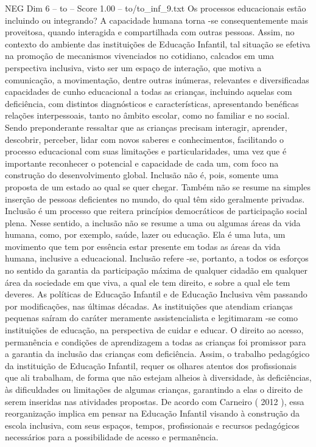 \begin{textsample}{NEG Dim 6 – to – Score 1.00 – to/to\_inf\_9.txt}
Os processos educacionais estão incluindo ou integrando?
A capacidade humana torna -se consequentemente mais proveitosa, quando interagida e compartilhada com outras pessoas.
Assim, no contexto do ambiente das instituições de Educação Infantil, tal situação se efetiva na promoção de mecanismos vivenciados no cotidiano, calcados em uma perspectiva inclusiva, visto ser um espaço de interação, que motiva a comunicação, a movimentação, dentre outras inúmeras, relevantes e diversificadas capacidades de cunho educacional a todas as crianças, incluindo aquelas com deficiência, com distintos diagnósticos e características, apresentando benéficas relações interpessoais, tanto no âmbito escolar, como no familiar e no social.
Sendo preponderante ressaltar que as crianças precisam interagir, aprender, descobrir, perceber, lidar com novos saberes e conhecimentos, facilitando o processo educacional com suas limitações e particularidades, uma vez que é importante reconhecer o potencial e capacidade de cada um, com foco na construção do desenvolvimento global.
Inclusão não é, pois, somente uma proposta de um estado ao qual se quer chegar.
Também não se resume na simples inserção de pessoas deficientes no mundo, do qual têm sido geralmente privadas.
Inclusão é um processo que reitera princípios democráticos de participação social plena.
Nesse sentido, a inclusão não se resume a uma ou algumas áreas da vida humana, como, por exemplo, saúde, lazer ou educação.
Ela é uma luta, um movimento que tem por essência estar presente em todas as áreas da vida humana, inclusive a educacional.
Inclusão refere -se, portanto, a todos os esforços no sentido da garantia da participação máxima de qualquer cidadão em qualquer área da sociedade em que viva, a qual ele tem direito, e sobre a qual ele tem deveres.
As políticas de Educação Infantil e de Educação Inclusiva vêm passando por modificações, nas últimas décadas.
As instituições que atendiam crianças pequenas saíram do caráter meramente assistencialista e legitimaram -se como instituições de educação, na perspectiva de cuidar e educar.
O direito ao acesso, permanência e condições de aprendizagem a todas as crianças foi promissor para a garantia da inclusão das crianças com deficiência.
Assim, o trabalho pedagógico da instituição de Educação Infantil, requer os olhares atentos dos profissionais que ali trabalham, de forma que não estejam alheios à diversidade, às deficiências, às dificuldades ou limitações de algumas crianças, garantindo a elas o direito de serem inseridas nas atividades propostas.
De acordo com Carneiro ( 2012 ), essa reorganização implica em pensar na Educação Infantil visando à construção da escola inclusiva, com seus espaços, tempos, profissionais e recursos pedagógicos necessários para a possibilidade de acesso e permanência.

\end{textsample}
